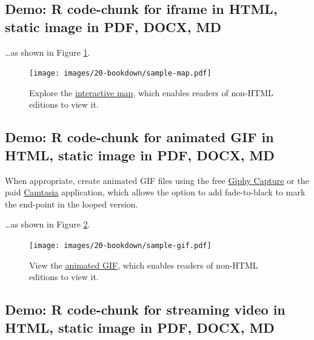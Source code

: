 \documentclass[
  english,
]{book}
\begin{document}
\hypertarget{demo-r-code-chunk-for-iframe-in-html-static-image-in-pdf-docx-md}{%
\subsection*{Demo: R code-chunk for iframe in HTML, static image in PDF, DOCX, MD}\label{demo-r-code-chunk-for-iframe-in-html-static-image-in-pdf-docx-md}}

\ldots as shown in Figure \ref{fig:sample-map}.



\begin{figure}
\centering
\texttt{[image: images/20-bookdown/sample-map.pdf]}
\caption{\label{fig:sample-map}Explore the \href{https://handsondataviz.github.io/leaflet-map-simple/}{interactive map}, which enables readers of non-HTML editions to view it.}
\end{figure}

\hypertarget{demo-r-code-chunk-for-animated-gif-in-html-static-image-in-pdf-docx-md}{%
\subsection*{Demo: R code-chunk for animated GIF in HTML, static image in PDF, DOCX, MD}\label{demo-r-code-chunk-for-animated-gif-in-html-static-image-in-pdf-docx-md}}

When appropriate, create animated GIF files using the free \href{https://giphy.com/apps/giphycapture}{Giphy Capture} or the paid \href{https://www.techsmith.com/video-editor.html}{Camtasia} application, which allows the option to add fade-to-black to mark the end-point in the looped version.

\ldots as shown in Figure \ref{fig:sample-gif}.



\begin{figure}
\centering
\texttt{[image: images/20-bookdown/sample-gif.pdf]}
\caption{\label{fig:sample-gif}View the \href{https://handsondataviz.org/images/20-bookdown/sample.gif}{animated GIF}, which enables readers of non-HTML editions to view it.}
\end{figure}

\hypertarget{demo-r-code-chunk-for-streaming-video-in-html-static-image-in-pdf-docx-md}{%
\subsection*{Demo: R code-chunk for streaming video in HTML, static image in PDF, DOCX, MD}\label{demo-r-code-chunk-for-streaming-video-in-html-static-image-in-pdf-docx-md}}
\end{document}
